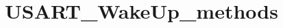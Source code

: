\hypertarget{group___u_s_a_r_t___wake_up__methods}{\section{U\-S\-A\-R\-T\-\_\-\-Wake\-Up\-\_\-methods}
\label{group___u_s_a_r_t___wake_up__methods}
}
